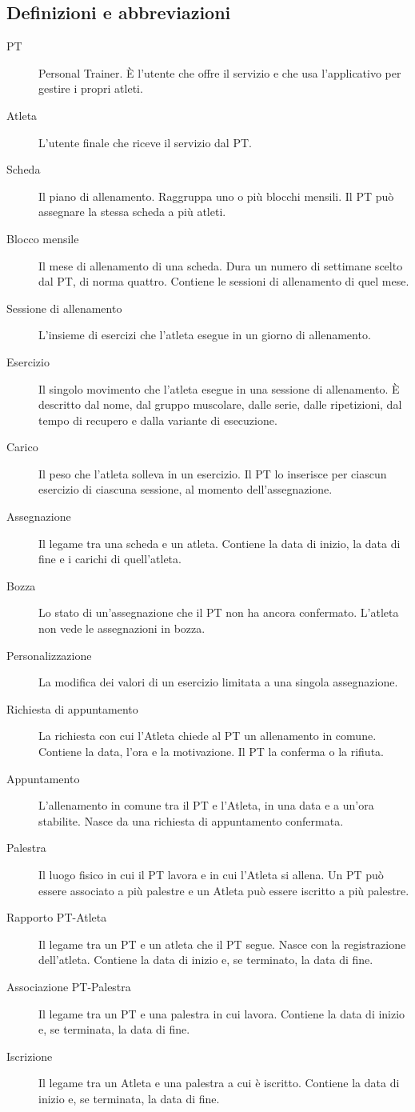 \subsection{Definizioni e abbreviazioni}
\begin{description}
  \item[PT] Personal Trainer. È l'utente che offre il servizio e che
    usa l'applicativo per gestire i propri atleti.
  \item[Atleta] L'utente finale che riceve il servizio dal PT.
  \item[Scheda] Il piano di allenamento. Raggruppa uno o più blocchi
    mensili. Il PT può assegnare la stessa scheda a più atleti.
  \item[Blocco mensile] Il mese di allenamento di una scheda. Dura un
    numero di settimane scelto dal PT, di norma quattro. Contiene le
    sessioni di allenamento di quel mese.
  \item[Sessione di allenamento] L'insieme di esercizi che l'atleta
    esegue in un giorno di allenamento.
  \item[Esercizio] Il singolo movimento che l'atleta esegue in una
    sessione di allenamento. È descritto dal nome, dal gruppo
    muscolare, dalle serie, dalle ripetizioni, dal tempo di recupero e
    dalla variante di esecuzione.
  \item[Carico] Il peso che l'atleta solleva in un esercizio. Il PT lo
    inserisce per ciascun esercizio di ciascuna sessione, al momento
    dell'assegnazione.
  \item[Assegnazione] Il legame tra una scheda e un atleta. Contiene la
    data di inizio, la data di fine e i carichi di quell'atleta.
  \item[Bozza] Lo stato di un'assegnazione che il PT non ha ancora
    confermato. L'atleta non vede le assegnazioni in bozza.
  \item[Personalizzazione] La modifica dei valori di un esercizio
    limitata a una singola assegnazione.
  \item[Richiesta di appuntamento] La richiesta con cui l'Atleta chiede
    al PT un allenamento in comune. Contiene la data, l'ora e la
    motivazione. Il PT la conferma o la rifiuta.
  \item[Appuntamento] L'allenamento in comune tra il PT e l'Atleta, in
    una data e a un'ora stabilite. Nasce da una richiesta di
    appuntamento confermata.
  \item[Palestra] Il luogo fisico in cui il PT lavora e in cui
    l'Atleta si allena. Un PT può essere associato a più palestre e
    un Atleta può essere iscritto a più palestre.
  \item[Rapporto PT-Atleta] Il legame tra un PT e un atleta che il PT
    segue. Nasce con la registrazione dell'atleta. Contiene la data di
    inizio e, se terminato, la data di fine.
  \item[Associazione PT-Palestra] Il legame tra un PT e una palestra
    in cui lavora. Contiene la data di inizio e, se terminata, la
    data di fine.
  \item[Iscrizione] Il legame tra un Atleta e una palestra a cui è
    iscritto. Contiene la data di inizio e, se terminata, la data di
    fine.
\end{description}

